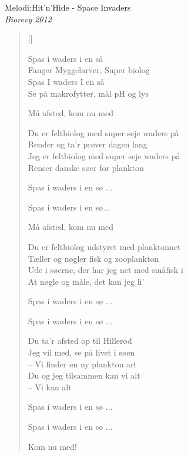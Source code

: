 {Melodi:Hit'n'Hide - Space Invaders}\\[.2em]
{\small\itshape Biorevy 2012}
\begin{multicols}{2}
\settowidth{\versewidth}{Ude i søerne, der har jeg net med småfisk i}
\begin{verse}[\versewidth]

Spas i waders i en så\\
Fanger Myggelarver, Super biolog\\
Spas I waders I en så\\
Se på makrofytter, mål pH og lys

Må afsted, kom nu med

Du er feltbiolog med super seje waders på\\
Render og ta'r prøver dagen lang\\
Jeg er feltbiolog med super seje waders på\\
Renser danske søer for plankton

Spas i waders i en sø ...

Spas i waders i en sø...

Må afsted, kom nu med

Du er feltbiolog udstyret med planktonnet\\
Tæller og nøgler fisk og zooplankton\\
Ude i søerne, der har jeg net med småfisk i\\
At nøgle og måle, det kan jeg li'

Spas i waders i en sø ...

Spas i waders i en sø ...

Du ta'r afsted op til Hillerød\\
Jeg vil med, se på livet i søen\\
 -- Vi finder en ny plankton art\\
Du og jeg tilsammen kan vi alt\\
 -- Vi kan alt

Spas i waders i en sø ...

Spas i waders i en sø ...

Kom nu med!
\end{verse}
\end{multicols}

